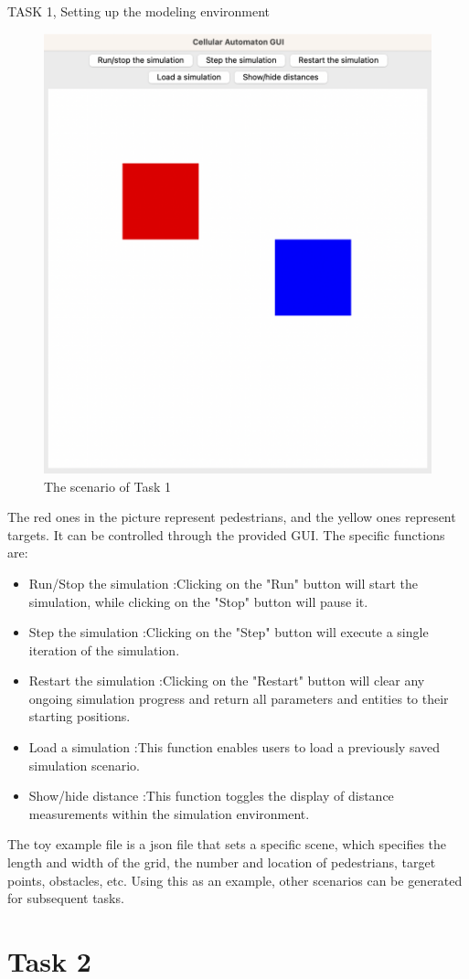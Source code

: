 \documentclass[10pt,a4paper]{article}
\begin{document}
\begin{task}{TASK 1, Setting up the modeling environment}
\begin{figure}[h]
      \centering
      \includegraphics[width=0.5\linewidth]{pictures/Task1.png}
      \caption{The scenario of Task 1}
      \label{fig:The scenario of Task 1}
  \end{figure}
The red ones in the picture represent pedestrians, and the yellow ones represent targets. It can be controlled through the provided GUI. The specific functions are:
\begin{itemize}
    \item Run/Stop the simulation :Clicking on the "Run" button will start the simulation, while clicking on the "Stop" button will pause it.
    \item Step the simulation :Clicking on the "Step" button will execute a single iteration of the simulation.
    \item Restart the simulation :Clicking on the "Restart" button will clear any ongoing simulation progress and return all parameters and entities to their starting positions.
    \item Load a simulation :This function enables users to load a previously saved simulation scenario.
    \item Show/hide distance :This function toggles the display of distance measurements within the simulation environment.
\end{itemize}
The toy example file is a json file that sets a specific scene, which specifies the length and width of the grid, the number and location of pedestrians, target points, obstacles, etc. Using this as an example, other scenarios can be generated for subsequent tasks.
\end{task}

\section{Task 2}
\end{document}
